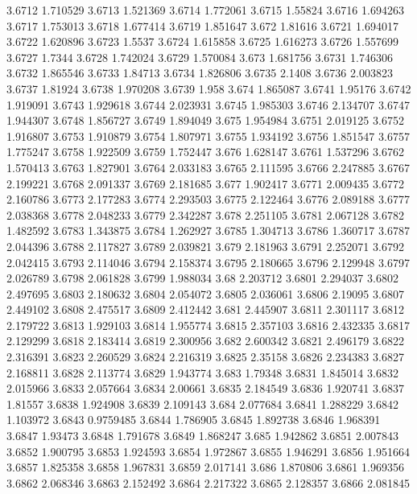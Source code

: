 3.6712  1.710529
3.6713  1.521369
3.6714  1.772061
3.6715  1.55824
3.6716  1.694263
3.6717  1.753013
3.6718  1.677414
3.6719  1.851647
3.672  1.81616
3.6721  1.694017
3.6722  1.620896
3.6723  1.5537
3.6724  1.615858
3.6725  1.616273
3.6726  1.557699
3.6727  1.7344
3.6728  1.742024
3.6729  1.570084
3.673  1.681756
3.6731  1.746306
3.6732  1.865546
3.6733  1.84713
3.6734  1.826806
3.6735  2.1408
3.6736  2.003823
3.6737  1.81924
3.6738  1.970208
3.6739  1.958
3.674  1.865087
3.6741  1.95176
3.6742  1.919091
3.6743  1.929618
3.6744  2.023931
3.6745  1.985303
3.6746  2.134707
3.6747  1.944307
3.6748  1.856727
3.6749  1.894049
3.675  1.954984
3.6751  2.019125
3.6752  1.916807
3.6753  1.910879
3.6754  1.807971
3.6755  1.934192
3.6756  1.851547
3.6757  1.775247
3.6758  1.922509
3.6759  1.752447
3.676  1.628147
3.6761  1.537296
3.6762  1.570413
3.6763  1.827901
3.6764  2.033183
3.6765  2.111595
3.6766  2.247885
3.6767  2.199221
3.6768  2.091337
3.6769  2.181685
3.677  1.902417
3.6771  2.009435
3.6772  2.160786
3.6773  2.177283
3.6774  2.293503
3.6775  2.122464
3.6776  2.089188
3.6777  2.038368
3.6778  2.048233
3.6779  2.342287
3.678  2.251105
3.6781  2.067128
3.6782  1.482592
3.6783  1.343875
3.6784  1.262927
3.6785  1.304713
3.6786  1.360717
3.6787  2.044396
3.6788  2.117827
3.6789  2.039821
3.679  2.181963
3.6791  2.252071
3.6792  2.042415
3.6793  2.114046
3.6794  2.158374
3.6795  2.180665
3.6796  2.129948
3.6797  2.026789
3.6798  2.061828
3.6799  1.988034
3.68  2.203712
3.6801  2.294037
3.6802  2.497695
3.6803  2.180632
3.6804  2.054072
3.6805  2.036061
3.6806  2.19095
3.6807  2.449102
3.6808  2.475517
3.6809  2.412442
3.681  2.445907
3.6811  2.301117
3.6812  2.179722
3.6813  1.929103
3.6814  1.955774
3.6815  2.357103
3.6816  2.432335
3.6817  2.129299
3.6818  2.183414
3.6819  2.300956
3.682  2.600342
3.6821  2.496179
3.6822  2.316391
3.6823  2.260529
3.6824  2.216319
3.6825  2.35158
3.6826  2.234383
3.6827  2.168811
3.6828  2.113774
3.6829  1.943774
3.683  1.79348
3.6831  1.845014
3.6832  2.015966
3.6833  2.057664
3.6834  2.00661
3.6835  2.184549
3.6836  1.920741
3.6837  1.81557
3.6838  1.924908
3.6839  2.109143
3.684  2.077684
3.6841  1.288229
3.6842  1.103972
3.6843  0.9759485
3.6844  1.786905
3.6845  1.892738
3.6846  1.968391
3.6847  1.93473
3.6848  1.791678
3.6849  1.868247
3.685  1.942862
3.6851  2.007843
3.6852  1.900795
3.6853  1.924593
3.6854  1.972867
3.6855  1.946291
3.6856  1.951664
3.6857  1.825358
3.6858  1.967831
3.6859  2.017141
3.686  1.870806
3.6861  1.969356
3.6862  2.068346
3.6863  2.152492
3.6864  2.217322
3.6865  2.128357
3.6866  2.081845
